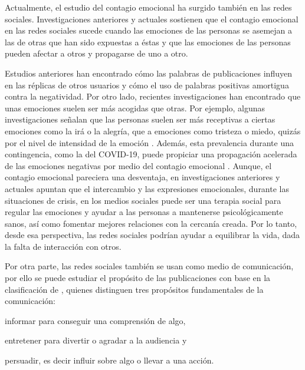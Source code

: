 \documentclass{textolivre}
\begin{document}
Actualmente, el estudio del contagio emocional ha surgido también en las redes sociales. Investigaciones anteriores \cite{kramer2014} y actuales \cite{goldenberg2020,steinert2020} sostienen que el contagio emocional en las redes sociales sucede cuando las emociones de las personas se asemejan a las de otras que han sido expuestas a éstas y que las emociones de las personas pueden afectar a otros y propagarse de uno a otro.

Estudios anteriores \cite{kramer2012} han encontrado cómo las palabras de publicaciones influyen en las réplicas de otros usuarios y cómo el uso de palabras positivas amortigua contra la negatividad. Por otro lado, recientes investigaciones han encontrado que unas emociones suelen ser más acogidas que otras. Por ejemplo, algunas investigaciones señalan que las personas suelen ser más receptivas a ciertas emociones como la irá o la alegría, que a emociones como tristeza o miedo, quizás por el nivel de intensidad de la emoción \cite{wang2020,goldenberg2020}. Además, esta prevalencia durante una contingencia, como la del COVID-19, puede propiciar una propagación acelerada de las emociones negativas por medio del contagio emocional \cite{goldenberg2020}. Aunque, el contagio emocional pareciera una desventaja, en investigaciones anteriores \cite{Bazarova2015} y actuales \cite{iglesiasSanchez2020} apuntan que el intercambio y las expresiones emocionales, durante las situaciones de crisis, en los medios sociales puede ser una terapia social para regular las emociones y ayudar a las personas a mantenerse psicológicamente sanos, así como fomentar mejores relaciones con la cercanía creada. Por lo tanto, desde esa perspectiva, las redes sociales podrían ayudar a equilibrar la vida, dada la falta de interacción con otros.

Por otra parte, las redes sociales también se usan como medio de comunicación, por ello se puede estudiar el propósito de las publicaciones con base en la clasificación de \textcite{monroe1973}, quienes distinguen tres propósitos fundamentales de la comunicación: 
\begin{enumerate*}[label=\arabic*)] 
\item informar para conseguir una comprensión de algo, 
\item entretener para divertir o agradar a la audiencia y 
\item persuadir, es decir influir sobre algo o llevar a una acción. 
\end{enumerate*}
\end{document}
